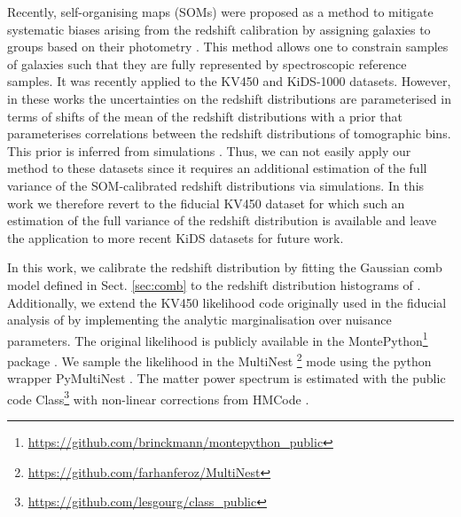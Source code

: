 \documentclass{aa}
\begin{document}
Recently, self-organising maps (SOMs) were proposed as a method to mitigate systematic biases arising from the redshift calibration by assigning galaxies to groups based on their photometry \citep{buchs, wright_som}. This method allows one to constrain samples of galaxies such that they are fully represented by spectroscopic reference samples. It was recently applied to the KV450 \citep{wright_som_kv450} and KiDS-1000 \citep{hildebrandt20, asgari20} datasets. However, in these works the uncertainties on the redshift distributions are parameterised in terms of shifts of the mean of the redshift distributions with a prior that parameterises correlations between the redshift distributions of tomographic bins. This prior is inferred from simulations \citep{hildebrandt20, vdBusch20}. Thus, we can not easily apply our method to these datasets since it requires an additional estimation of the full variance of the SOM-calibrated redshift distributions via simulations. In this work we therefore revert to the fiducial KV450 dataset for which such an estimation of the full variance of the redshift distribution is available and leave the application to more recent KiDS datasets for future work.

In this work, we calibrate the redshift distribution by fitting the Gaussian comb model defined in Sect. \ref{sec:comb} to the redshift distribution histograms of \cite{hildebrandt18}. Additionally, we extend the KV450 likelihood code originally used in the fiducial analysis of \cite{hildebrandt18} by implementing the analytic marginalisation over nuisance parameters. The original likelihood is publicly available in the {\sc MontePython}\footnote{\url{https://github.com/brinckmann/montepython_public}} package \citep{Audren:2012wb, Brinckmann:2018cvx}. We sample the likelihood in the {\sc MultiNest} \footnote{\url{https://github.com/farhanferoz/MultiNest}} mode \citep{feroz09,feroz19} using the python wrapper {\sc PyMultiNest} \citep{buchner14}. The matter power spectrum is estimated with the public code {\sc Class}\footnote{\url{https://github.com/lesgourg/class_public}}\citep{blas11} with non-linear corrections from {\sc HMCode} \citep{mead15}. 
\end{document}
